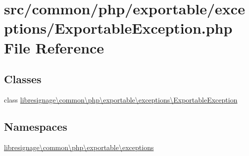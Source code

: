 \hypertarget{ExportableException_8php}{}\section{src/common/php/exportable/exceptions/\+Exportable\+Exception.php File Reference}
\label{ExportableException_8php}
\subsection*{Classes}
\begin{DoxyCompactItemize}
\item 
class \hyperlink{classlibresignage_1_1common_1_1php_1_1exportable_1_1exceptions_1_1ExportableException}{libresignage\textbackslash{}common\textbackslash{}php\textbackslash{}exportable\textbackslash{}exceptions\textbackslash{}\+Exportable\+Exception}
\end{DoxyCompactItemize}
\subsection*{Namespaces}
\begin{DoxyCompactItemize}
\item 
 \hyperlink{namespacelibresignage_1_1common_1_1php_1_1exportable_1_1exceptions}{libresignage\textbackslash{}common\textbackslash{}php\textbackslash{}exportable\textbackslash{}exceptions}
\end{DoxyCompactItemize}
